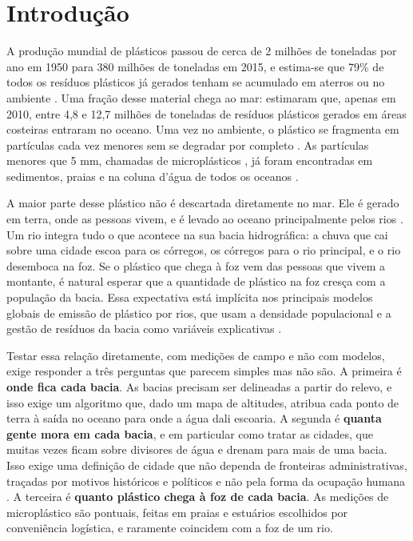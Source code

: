 \chapter{Introdução}
\label{chap:introducao}

A produção mundial de plásticos passou de cerca de 2 milhões de toneladas por ano em 1950 para 380 milhões de toneladas em 2015, e estima-se que 79\% de todos os resíduos plásticos já gerados tenham se acumulado em aterros ou no ambiente \cite{geyer2017}. Uma fração desse material chega ao mar:  estimaram que, apenas em 2010, entre 4,8 e 12,7 milhões de toneladas de resíduos plásticos gerados em áreas costeiras entraram no oceano. Uma vez no ambiente, o plástico se fragmenta em partículas cada vez menores sem se degradar por completo \cite{barnes2009,andrady2011}. As partículas menores que 5 mm, chamadas de microplásticos \cite{frias2019}, já foram encontradas em sedimentos, praias e na coluna d'água de todos os oceanos \cite{thompson2004,eriksen2014}.

A maior parte desse plástico não é descartada diretamente no mar. Ele é gerado em terra, onde as pessoas vivem, e é levado ao oceano principalmente pelos rios \cite{lebreton2017,schmidt2017,meijer2021}. Um rio integra tudo o que acontece na sua bacia hidrográfica: a chuva que cai sobre uma cidade escoa para os córregos, os córregos para o rio principal, e o rio desemboca na foz. Se o plástico que chega à foz vem das pessoas que vivem a montante, é natural esperar que a quantidade de plástico na foz cresça com a população da bacia. Essa expectativa está implícita nos principais modelos globais de emissão de plástico por rios, que usam a densidade populacional e a gestão de resíduos da bacia como variáveis explicativas \cite{lebreton2017,meijer2021}.

Testar essa relação diretamente, com medições de campo e não com modelos, exige responder a três perguntas que parecem simples mas não são. A primeira é \textbf{onde fica cada bacia}. As bacias precisam ser delineadas a partir do relevo, e isso exige um algoritmo que, dado um mapa de altitudes, atribua cada ponto de terra à saída no oceano para onde a água dali escoaria. A segunda é \textbf{quanta gente mora em cada bacia}, e em particular como tratar as cidades, que muitas vezes ficam sobre divisores de água e drenam para mais de uma bacia. Isso exige uma definição de cidade que não dependa de fronteiras administrativas, traçadas por motivos históricos e políticos e não pela forma da ocupação humana \cite{rozenfeld2008,rozenfeld2011}. A terceira é \textbf{quanto plástico chega à foz de cada bacia}. As medições de microplástico são pontuais, feitas em praias e estuários escolhidos por conveniência logística, e raramente coincidem com a foz de um rio.

